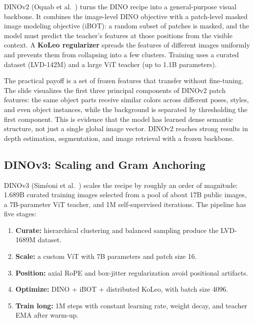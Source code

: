 DINOv2 (Oquab et al.~\cite{oquab2023dinov2}) turns the DINO recipe into a general-purpose visual backbone. It combines the image-level DINO objective with a patch-level masked image modeling objective (iBOT): a random subset of patches is masked, and the model must predict the teacher's features at those positions from the visible context. A \textbf{KoLeo regularizer} spreads the features of different images uniformly and prevents them from collapsing into a few clusters. Training uses a curated dataset (LVD-142M) and a large ViT teacher (up to 1.1B parameters).

The practical payoff is a set of frozen features that transfer without fine-tuning. The slide visualizes the first three principal components of DINOv2 patch features: the same object parts receive similar colors across different poses, styles, and even object instances, while the background is separated by thresholding the first component. This is evidence that the model has learned dense semantic structure, not just a single global image vector. DINOv2 reaches strong results in depth estimation, segmentation, and image retrieval with a frozen backbone.

\subsection{\texorpdfstring{DINOv3:}{DINOv3:} Scaling and Gram Anchoring}

DINOv3 (Sim{\'e}oni et al.~\cite{simeoni2025dinov3}) scales the recipe by roughly an order of magnitude: 1.689B curated training images selected from a pool of about 17B public images, a 7B-parameter ViT teacher, and 1M self-supervised iterations. The pipeline has five stages:
\begin{enumerate}[leftmargin=*]
    \item \textbf{Curate:} hierarchical clustering and balanced sampling produce the LVD-1689M dataset.
    \item \textbf{Scale:} a custom ViT with 7B parameters and patch size 16.
    \item \textbf{Position:} axial RoPE and box-jitter regularization avoid positional artifacts.
    \item \textbf{Optimize:} DINO + iBOT + distributed KoLeo, with batch size 4096.
    \item \textbf{Train long:} 1M steps with constant learning rate, weight decay, and teacher EMA after warm-up.
\end{enumerate}

